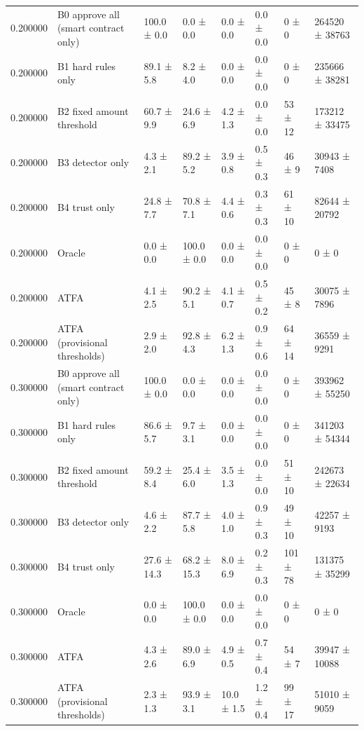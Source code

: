 \begin{tabular}{rlllllll}
0.200000 & B0 approve all (smart contract only) & 100.0 ± 0.0 & 0.0 ± 0.0 & 0.0 ± 0.0 & 0.0 ± 0.0 & 0 ± 0 & 264520 ± 38763 \\
0.200000 & B1 hard rules only & 89.1 ± 5.8 & 8.2 ± 4.0 & 0.0 ± 0.0 & 0.0 ± 0.0 & 0 ± 0 & 235666 ± 38281 \\
0.200000 & B2 fixed amount threshold & 60.7 ± 9.9 & 24.6 ± 6.9 & 4.2 ± 1.3 & 0.0 ± 0.0 & 53 ± 12 & 173212 ± 33475 \\
0.200000 & B3 detector only & 4.3 ± 2.1 & 89.2 ± 5.2 & 3.9 ± 0.8 & 0.5 ± 0.3 & 46 ± 9 & 30943 ± 7408 \\
0.200000 & B4 trust only & 24.8 ± 7.7 & 70.8 ± 7.1 & 4.4 ± 0.6 & 0.3 ± 0.3 & 61 ± 10 & 82644 ± 20792 \\
0.200000 & Oracle & 0.0 ± 0.0 & 100.0 ± 0.0 & 0.0 ± 0.0 & 0.0 ± 0.0 & 0 ± 0 & 0 ± 0 \\
0.200000 & ATFA & 4.1 ± 2.5 & 90.2 ± 5.1 & 4.1 ± 0.7 & 0.5 ± 0.2 & 45 ± 8 & 30075 ± 7896 \\
0.200000 & ATFA (provisional thresholds) & 2.9 ± 2.0 & 92.8 ± 4.3 & 6.2 ± 1.3 & 0.9 ± 0.6 & 64 ± 14 & 36559 ± 9291 \\
0.300000 & B0 approve all (smart contract only) & 100.0 ± 0.0 & 0.0 ± 0.0 & 0.0 ± 0.0 & 0.0 ± 0.0 & 0 ± 0 & 393962 ± 55250 \\
0.300000 & B1 hard rules only & 86.6 ± 5.7 & 9.7 ± 3.1 & 0.0 ± 0.0 & 0.0 ± 0.0 & 0 ± 0 & 341203 ± 54344 \\
0.300000 & B2 fixed amount threshold & 59.2 ± 8.4 & 25.4 ± 6.0 & 3.5 ± 1.3 & 0.0 ± 0.0 & 51 ± 10 & 242673 ± 22634 \\
0.300000 & B3 detector only & 4.6 ± 2.2 & 87.7 ± 5.8 & 4.0 ± 1.0 & 0.9 ± 0.3 & 49 ± 10 & 42257 ± 9193 \\
0.300000 & B4 trust only & 27.6 ± 14.3 & 68.2 ± 15.3 & 8.0 ± 6.9 & 0.2 ± 0.3 & 101 ± 78 & 131375 ± 35299 \\
0.300000 & Oracle & 0.0 ± 0.0 & 100.0 ± 0.0 & 0.0 ± 0.0 & 0.0 ± 0.0 & 0 ± 0 & 0 ± 0 \\
0.300000 & ATFA & 4.3 ± 2.6 & 89.0 ± 6.9 & 4.9 ± 0.5 & 0.7 ± 0.4 & 54 ± 7 & 39947 ± 10088 \\
0.300000 & ATFA (provisional thresholds) & 2.3 ± 1.3 & 93.9 ± 3.1 & 10.0 ± 1.5 & 1.2 ± 0.4 & 99 ± 17 & 51010 ± 9059 \\
\bottomrule
\end{tabular}
